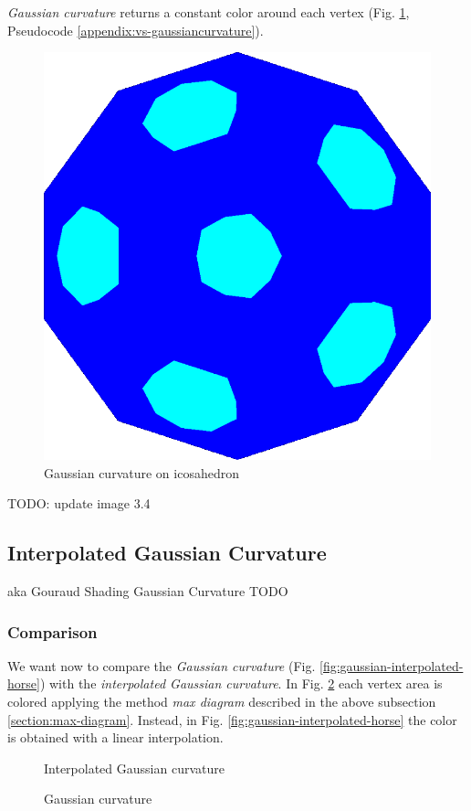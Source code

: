 \textit{Gaussian curvature} returns a constant color around each vertex (Fig. \ref{fig:gc-icosahedron}, Pseudocode \ref{appendix:vs-gaussiancurvature}).
\begin{figure}[h]
    \centering
    \includegraphics[scale=0.2]{images/gaussian-ball.png}
    \caption{Gaussian curvature on icosahedron}\label{fig:gc-icosahedron}
\end{figure}
TODO: update image 3.4

\subsection{Interpolated Gaussian Curvature}
aka Gouraud Shading Gaussian Curvature
TODO

\subsubsection{Comparison}
We want now to compare the \textit{Gaussian curvature} (Fig. \ref{fig:gaussian-interpolated-horse}) with the \textit{interpolated Gaussian curvature}. In Fig. \ref{fig:gaussian-horse} each vertex area is colored applying the method \textit{max diagram} described in the above subsection \ref{section:max-diagram}. Instead, in Fig. \ref{fig:gaussian-interpolated-horse} the color is obtained with a linear interpolation.
\begin{figure}[!htb]
\centering
    \caption{Interpolated Gaussian curvature} \label{fig:gaussian-interpolated-horse}
  \endminipage\hfill
  \centering
    \caption{Gaussian curvature}\label{fig:gaussian-horse}
  \endminipage
  \end{figure}

